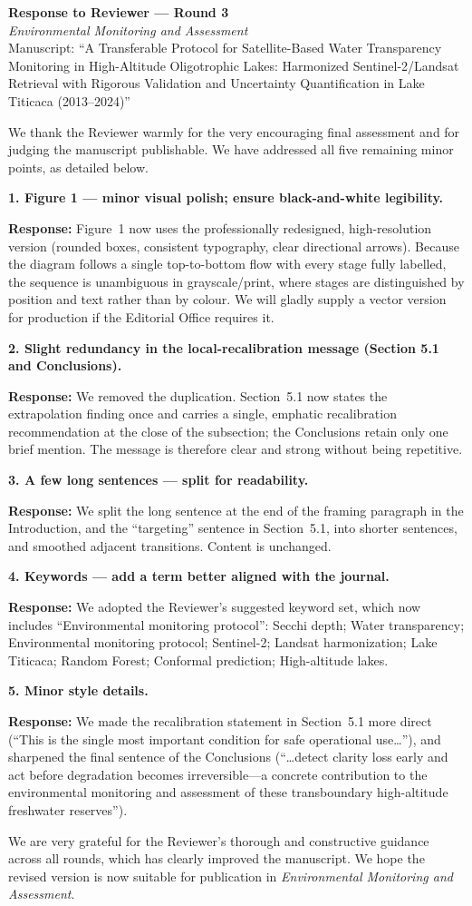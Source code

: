 \documentclass[11pt]{article}
\newcommand{\resp}[1]{\par\noindent\textcolor{blue!60!black}{\textbf{Response:}} #1\par\medskip}
\begin{document}
\begin{center}
{\large\textbf{Response to Reviewer --- Round 3}}\\[0.3em]
\textit{Environmental Monitoring and Assessment}\\[0.2em]
Manuscript: ``A Transferable Protocol for Satellite-Based Water Transparency
Monitoring in High-Altitude Oligotrophic Lakes: Harmonized Sentinel-2/Landsat
Retrieval with Rigorous Validation and Uncertainty Quantification in Lake Titicaca
(2013--2024)''
\end{center}

We thank the Reviewer warmly for the very encouraging final assessment and for
judging the manuscript publishable. We have addressed all five remaining minor
points, as detailed below.

\hrulefill

\textbf{1. Figure 1 --- minor visual polish; ensure black-and-white legibility.}
\resp{Figure~1 now uses the professionally redesigned, high-resolution version
(rounded boxes, consistent typography, clear directional arrows). Because the
diagram follows a single top-to-bottom flow with every stage fully labelled, the
sequence is unambiguous in grayscale/print, where stages are distinguished by
position and text rather than by colour. We will gladly supply a vector version for
production if the Editorial Office requires it.}

\textbf{2. Slight redundancy in the local-recalibration message (Section 5.1 and
Conclusions).}
\resp{We removed the duplication. Section~5.1 now states the extrapolation finding
once and carries a single, emphatic recalibration recommendation at the close of the
subsection; the Conclusions retain only one brief mention. The message is therefore
clear and strong without being repetitive.}

\textbf{3. A few long sentences --- split for readability.}
\resp{We split the long sentence at the end of the framing paragraph in the
Introduction, and the ``targeting'' sentence in Section~5.1, into shorter sentences,
and smoothed adjacent transitions. Content is unchanged.}

\textbf{4. Keywords --- add a term better aligned with the journal.}
\resp{We adopted the Reviewer's suggested keyword set, which now includes
``Environmental monitoring protocol'': Secchi depth; Water transparency;
Environmental monitoring protocol; Sentinel-2; Landsat harmonization; Lake Titicaca;
Random Forest; Conformal prediction; High-altitude lakes.}

\textbf{5. Minor style details.}
\resp{We made the recalibration statement in Section~5.1 more direct (``This is the
single most important condition for safe operational use\ldots''), and sharpened the
final sentence of the Conclusions (``\ldots detect clarity loss early and act before
degradation becomes irreversible---a concrete contribution to the environmental
monitoring and assessment of these transboundary high-altitude freshwater
reserves'').}

\hrulefill

We are very grateful for the Reviewer's thorough and constructive guidance across
all rounds, which has clearly improved the manuscript. We hope the revised version
is now suitable for publication in \textit{Environmental Monitoring and Assessment}.
\end{document}
